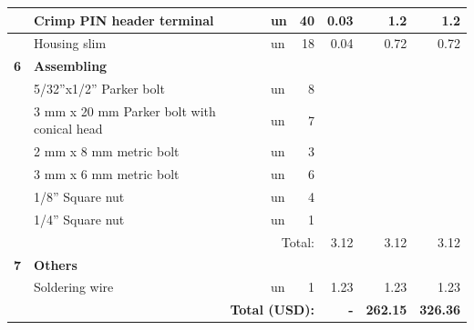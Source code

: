 \documentclass[12pt,letterpaper]{article}
\numberwithin{figure}{section}
\numberwithin{equation}{section}
\numberwithin{table}{section}
\begin{document}
\begin{appendices}
\begin{table}[]
{\begin{tabular}{|l|l|l|r|r|r|r|}
            & Crimp PIN header terminal               & un     & 40     & 0.03     & 1.2     & 1.2     \\ \hline
            & Housing slim                            & un     & 18     & 0.04     & 0.72    & 0.72    \\ \hline
\textbf{6}  & \multicolumn{6}{l|}{\textbf{ Assembling }} \\ 
\hline
            & 5/32''x1/2'' Parker bolt                & un     & 8      &          &         &         \\ \hline
            & 3 mm x 20 mm Parker bolt with conical head  & un     & 7      &          &         &         \\ \hline
            & 2 mm x 8 mm metric bolt                     & un     & 3      &          &         &         \\ \hline
            & 3 mm x 6 mm metric bolt                     & un     & 6      &          &         &         \\ \hline
            & 1/8'' Square nut                        & un     & 4      &          &         &         \\ \hline
            & 1/4'' Square nut                        & un     & 1      &          &         &         \\ \hline
            & \multicolumn{3}{r|}{Total:}                               & 3.12     & 3.12    & 3.12    \\ \hline
\textbf{7}  & \multicolumn{6}{l|}{\textbf{Others}} \\
 \hline
            & Soldering wire                         & un      & 1      & 1.23     & 1.23    & 1.23    \\ \hline
\multicolumn{4}{|r|}{\textbf{Total (USD):}}          & \textbf{-}  & \textbf{262.15} & \textbf{326.36} \\ \hline
\end{tabular}}
\end{table}


\end{appendices}
\end{document}
